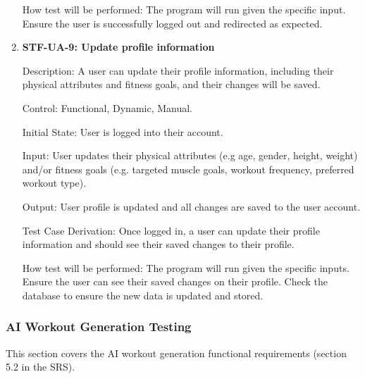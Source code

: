 \documentclass[12pt, titlepage]{article}
\begin{document}
\begin{enumerate}
How test will be performed: The program will run given the specific input. Ensure the user is successfully logged out and redirected as expected.
 
\item{\textbf{STF-UA-9: Update profile information}\\}

Description: A user can update their profile information, including their physical attributes and fitness goals, and their changes will be saved.
	
Control: Functional, Dynamic, Manual.

Initial State: User is logged into their account.

Input: User updates their physical attributes (e.g age, gender, height, weight) and/or fitness goals (e.g. targeted muscle goals, workout frequency, preferred workout type).

Output: User profile is updated and all changes are saved to the user account.

Test Case Derivation: Once logged in, a user can update their profile information and should see their saved changes to their profile. 

How test will be performed: The program will run given the specific inputs. Ensure the user can see their saved changes on their profile. Check the database to ensure the new data is updated and stored. 

\end{enumerate}

\subsubsection{AI Workout Generation Testing}
This section covers the AI workout generation functional requirements (section 5.2 in the SRS).
\end{document}
